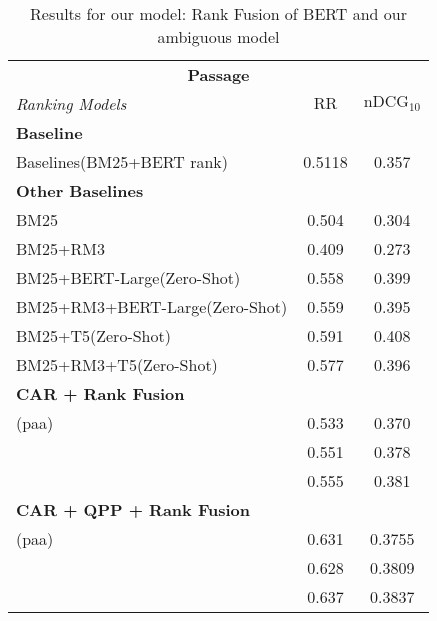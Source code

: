 \begin{table}
    \centering
    \begin{tabular}{lcc}
        \toprule

             \multicolumn{3}{c}{\textbf{\mshard{} Passage}} \\
            \cmidrule(lr){1-3}
            \textit{Ranking Models}
            &    $\text{RR}$ & $\text{nDCG}_\text{10}$ \\
            \midrule

\multicolumn{3}{l}{\bf Baseline} \\
Baselines(BM25+BERT rank) & 0.5118 & 0.357\\
\midrule
\multicolumn{3}{l}{\bf Other Baselines} \\
BM25 & 0.504 & 0.304\\
BM25+RM3 & 0.409 & 0.273\\
BM25+BERT-Large(Zero-Shot) & 0.558 & 0.399\up{11.8}\\
BM25+RM3+BERT-Large(Zero-Shot) & 0.559 & 0.395\up{10.6}\\
BM25+T5(Zero-Shot) & 0.591 & 0.408\up{14.3}\\
BM25+RM3+T5(Zero-Shot) & 0.577 & 0.396\up{10.9} \\
\midrule
\multicolumn{3}{l}{\bf CAR + Rank Fusion} \\
\bart{} (paa) & 0.533 & 0.370\up{3.53}\\
\vinci{} & 0.551 & 0.378\up{5.74}\\
\chatgpt{} & 0.555 & 0.381\up{6.81}\\


\midrule
\multicolumn{3}{l}{\bf CAR + QPP + Rank Fusion} \\

\bart{} (paa) & 0.631 & 0.3755\up{5.2}\\
\vinci{} & 0.628 & 0.3809\up{6.7}\\
\chatgpt{} & 0.637 & 0.3837\up{7.5}\\
        \bottomrule        
    \end{tabular}

    
    \caption{Results for our model: Rank Fusion of BERT and our ambiguous model}
    \label{tab:reranking-msmarco-hard-doc}
\end{table}
